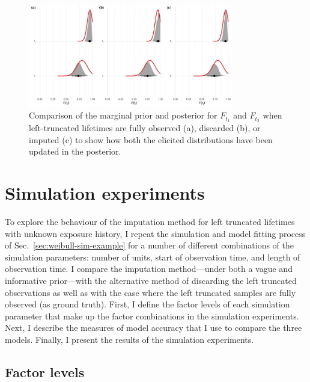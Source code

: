 \begin{figure}
    \centering
    \includegraphics[width=0.8\textwidth]{./figures/ch-2/prior-post-comp.pdf}
    \caption{Comparison of the marginal prior and posterior for $F_{t_1}$ and $F_{t_2}$ when left-truncated lifetimes are fully observed (a), discarded (b), or imputed (c) to show how both the elicited distributions have been updated in the posterior.}
    \label{fig:weibull-prior-post-comp}
\end{figure}

\section{Simulation experiments} \label{sec:weibull-sim-study}

To explore the behaviour of the imputation method for left truncated lifetimes with unknown exposure history, I repeat the simulation and model fitting process of Sec.~\ref{sec:weibull-sim-example} for a number of different combinations of the simulation parameters: number of units, start of observation time, and length of observation time. I compare the imputation method---under both a vague and informative prior---with the alternative method of discarding the left truncated observations as well as with the case where the left truncated samples are fully observed (as ground truth). First, I define the factor levels of each simulation parameter that make up the factor combinations in the simulation experiments. Next, I describe the measures of model accuracy that I use to compare the three models. Finally, I present the results of the simulation experiments.

\subsection{Factor levels}

